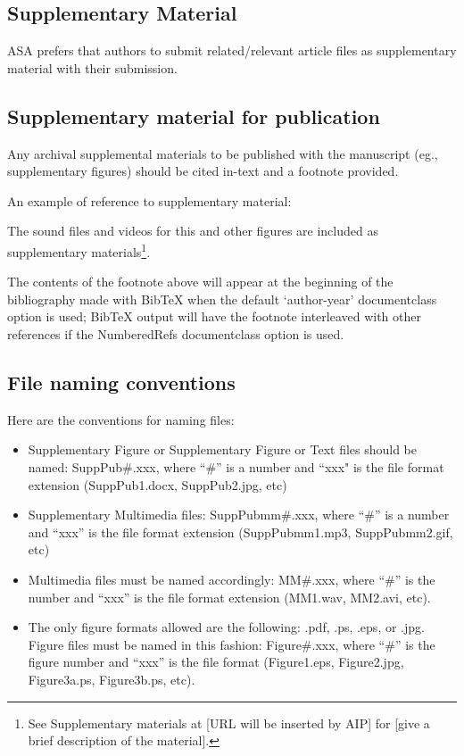\documentclass[reprint]{JASA}
\begin{document}
\subsection{Supplementary Material}
ASA
prefers that authors to submit related/relevant article files as
supplementary material with their submission.

\subsection{Supplementary material for publication}
Any archival supplemental materials to be published with the
manuscript (eg., supplementary figures) should be cited in-text and a footnote provided.

An example of reference to supplementary material:

The sound files and videos for this and other figures
are included as supplementary materials\footnote{See
Supplementary materials at [URL will be inserted by AIP]
for [give a brief description of the material].}.

The contents of the footnote above will appear at the beginning of the
bibliography made with BibTeX when the default `author-year' documentclass option is used;
BibTeX output will have the footnote interleaved with other
references if the NumberedRefs documentclass option is used.

\subsection{File naming conventions}
Here are the conventions for naming files:

\begin{itemize}
\item
Supplementary Figure or
	Supplementary Figure or Text files should be named: SuppPub\#.xxx, where ``\#'' is
	a number and ``xxx" is the file format extension
	(SuppPub1.docx, SuppPub2.jpg, etc)

\item
	Supplementary Multimedia files: SuppPubmm\#.xxx, where ``\#'' is a
	number and ``xxx'' is the file format extension (SuppPubmm1.mp3,
	SuppPubmm2.gif, etc)

\item
Multimedia files must be named accordingly: MM\#.xxx, where ``\#'' is the
number and ``xxx'' is the file format extension (MM1.wav, MM2.avi, etc).

\item
The only figure formats allowed are the following: 
.pdf, .ps, .eps, or .jpg. Figure files must be named in this fashion:
Figure\#.xxx, where ``\#'' is the figure number and ``xxx'' is the file format
(Figure1.eps, Figure2.jpg, Figure3a.ps, Figure3b.ps, etc). 

\end{itemize}
\end{document}
